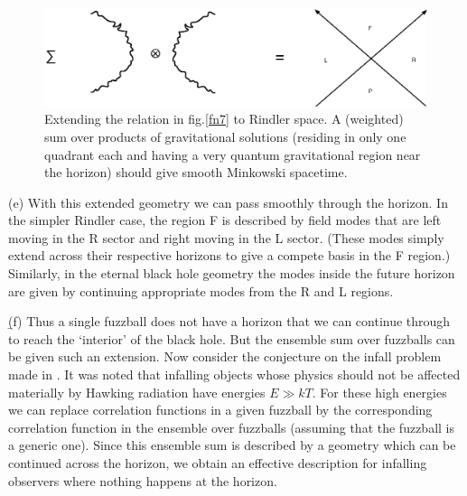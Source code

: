 \documentclass[12pt]{article}
\begin{document}
\begin{figure}[htbp]
\begin{center}
\includegraphics[scale=.85]{fn12.eps}
\caption{{Extending the relation in fig.\ref{fn7} to Rindler space. A (weighted) sum over products of gravitational solutions (residing in only one quadrant each and having a very quantum gravitational region  near the horizon) should give smooth Minkowski spacetime.}}
\label{fn12}
\end{center}
\end{figure}


(e) With this extended geometry we can pass smoothly through the horizon. In the simpler Rindler case, the region F is described by field modes that are left moving in the R sector and right moving in the L sector. (These modes simply extend across their respective horizons to give a compete basis in the F region.) Similarly, in the eternal black hole geometry the modes inside the future horizon are given by continuing appropriate modes from the R and L regions. 

\b

(f) Thus a single fuzzball does not have a horizon that we can continue through to reach the `interior' of the black hole. But the ensemble sum over fuzzballs can be given such an extension. Now consider the conjecture on the infall problem made in \cite{mathurrecent}. It was noted that infalling objects whose physics should not be affected materially by Hawking radiation have energies $E\gg kT$. For these high energies we can replace correlation functions in a given fuzzball by the corresponding  correlation function in the ensemble over fuzzballs (assuming that the fuzzball is a generic one). Since this ensemble sum is described by a geometry which can be continued across the horizon, we obtain an effective description for infalling observers where nothing happens at the horizon.
\end{document}
